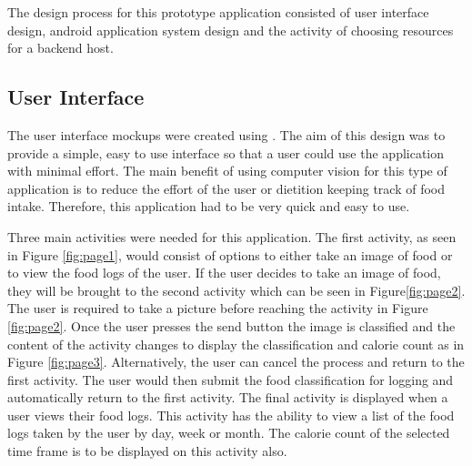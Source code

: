 The design process for this prototype application consisted of user interface design, android application system design and the activity of choosing resources for a backend host.

\subsection*{User Interface}
The user interface mockups were created using \textcite{fluid}.
The aim of this design was to provide a simple, easy to use interface so that a user could use the application with minimal effort.
The main benefit of using computer vision for this type of application is to reduce the effort of the user or dietition keeping track of food intake.
Therefore, this application had to be very quick and easy to use.

Three main activities were needed for this application.
The first activity, as seen in Figure \ref{fig:page1}, would consist of options to either take an image of food or to view the food logs of the user.
If the user decides to take an image of food, they will be brought to the second activity which can be seen in Figure\ref{fig:page2}.
The user is required to take a picture before reaching the activity in Figure \ref{fig:page2}.
Once the user presses the send button the image is classified and the content of the activity changes to display the classification and calorie count as in Figure \ref{fig:page3}.
Alternatively, the user can cancel the process and return to the first activity.
The user would then submit the food classification for logging and automatically return to the first activity.
The final activity is displayed when a user views their food logs.
This activity has the ability to view a list of the food logs taken by the user by day, week or month.
The calorie count of the selected time frame is to be displayed on this activity also.

